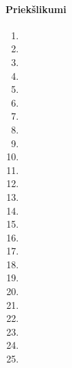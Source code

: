 \paragraph{Priekšlikumi}
\hfill\par
\begin{enumerate}
	\item 
	\item 
	\item 
	\item 
	\item 
	\item 
	\item 
	\item 
	\item 
	\item 
	\item 
	\item 
	\item 
	\item 
	\item 
	\item 
	\item 
	\item 
	\item 
	\item 
	\item 
	\item 
	\item 
	\item 
	\item 
\end{enumerate}